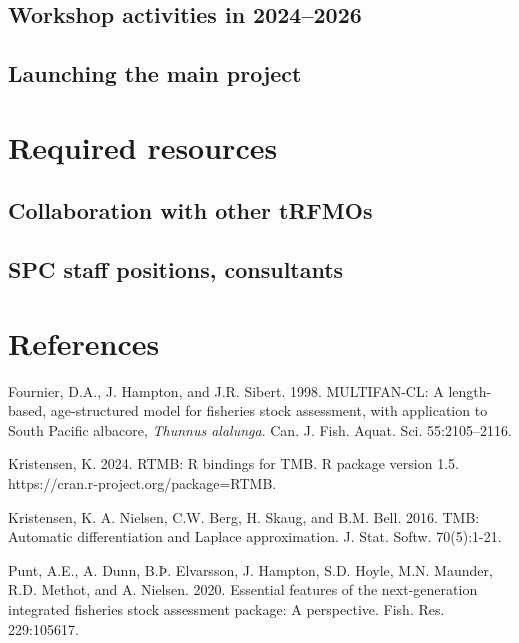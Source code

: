 \documentclass{SCreport}
\begin{document}
\subsection{Workshop activities in 2024--2026}

\subsection{Launching the main project}

\section{Required resources}

\subsection{Collaboration with other tRFMOs}

\subsection{SPC staff positions, consultants}

\section{References}

\sloppy\setlength{}

\begin{description}\setlength\itemsep{0ex}
  \item Fournier, D.A., J. Hampton, and J.R. Sibert. 1998. MULTIFAN-CL: A
  length-based, age-structured model for fisheries stock assessment, with
  application to South Pacific albacore, \textit{Thunnus alalunga}. Can. J.
  Fish. Aquat. Sci. 55:2105--2116.
  \item Kristensen, K. 2024. RTMB: R bindings for TMB. R package version 1.5.\\
  https://cran.r-project.org/package=RTMB.
  \item Kristensen, K. A. Nielsen, C.W. Berg, H. Skaug, and B.M. Bell. 2016.
  TMB: Automatic differentiation and Laplace approximation. J. Stat. Softw.
  70(5):1-21.
  \item Punt, A.E., A. Dunn, B.Þ. Elvarsson, J. Hampton, S.D. Hoyle, M.N.
  Maunder, R.D. Methot, and A. Nielsen. 2020. Essential features of the
  next-generation integrated fisheries stock assessment package: A perspective.
  Fish. Res. 229:105617.
\end{description}
\end{document}
